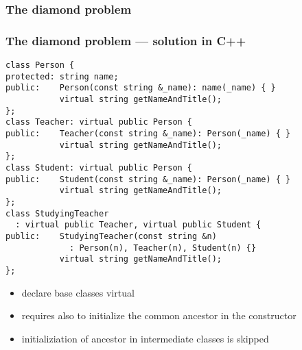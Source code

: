 \documentclass{slides}
\begin{document}
\begin{frame}
  \frametitle{The diamond problem}

  \begin{center}
  \end{center}
\end{frame}

\begin{frame}[fragile]
  \frametitle{The diamond problem --- solution in C++}

\begin{lstlisting}[basicstyle={\ttfamily\tiny},emph={virtual}]
class Person {
protected: string name;
public:    Person(const string &_name): name(_name) { }
           virtual string getNameAndTitle();
};
class Teacher: virtual public Person {
public:    Teacher(const string &_name): Person(_name) { }
           virtual string getNameAndTitle();
};
class Student: virtual public Person {
public:    Student(const string &_name): Person(_name) { }
           virtual string getNameAndTitle();
};
class StudyingTeacher
  : virtual public Teacher, virtual public Student {
public:    StudyingTeacher(const string &n)
             : Person(n), Teacher(n), Student(n) {}
           virtual string getNameAndTitle();
};
\end{lstlisting}

  \begin{itemize}
  \item declare base classes virtual
  \item requires also to initialize the common ancestor in the constructor
  \item initializiation of ancestor in intermediate classes is skipped
  \end{itemize}
\end{frame}
\end{document}
